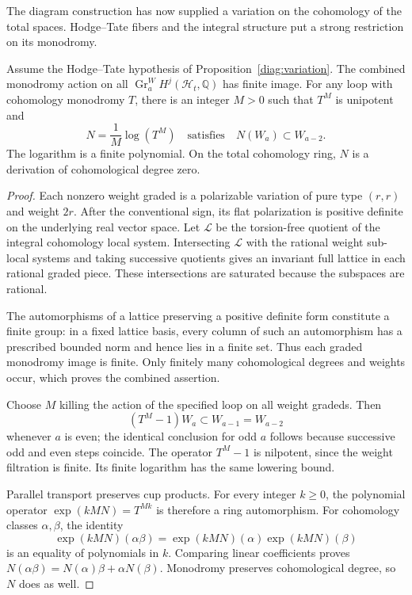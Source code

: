 The diagram construction has now supplied a variation on the
cohomology of the total spaces.  Hodge--Tate fibers and the integral
structure put a strong restriction on its monodromy.

\begin{lemma}
 \label{diag:finite}
 Assume the Hodge--Tate hypothesis of
 Proposition~\ref{diag:variation}.  The combined monodromy action
 on all $\operatorname{Gr}^W_aH^j(\mathscr H_t,\mathbb Q)$ has finite
 image.  For any loop with cohomology monodromy $T$, there is an integer
 $M>0$ such that $T^M$ is unipotent and
 \begin{equation}
  \label{diag:log}
  N=\frac{1}{M}\log(T^M)
  \quad\text{satisfies}\quad N(W_a)\subset W_{a-2}.
 \end{equation}
 The logarithm is a finite polynomial.  On the total cohomology ring,
 $N$ is a derivation of cohomological degree zero.
\end{lemma}

\begin{proof}
 Each nonzero weight graded is a polarizable variation of pure type
 $(r,r)$ and weight $2r$.  After the conventional sign, its flat
 polarization is positive definite on the underlying real vector
 space.  Let $\mathcal L$ be the torsion-free quotient of the integral
 cohomology local system.  Intersecting $\mathcal L$ with the rational
 weight sub-local systems and taking successive quotients gives an
 invariant full lattice in each rational graded piece.  These
 intersections are saturated because the subspaces are rational.

 The automorphisms of a lattice preserving a positive definite form
 constitute a finite group: in a fixed lattice basis, every column of
 such an automorphism has a prescribed bounded norm and hence lies
 in a finite set.  Thus each graded monodromy image is finite.  Only
 finitely many cohomological degrees and weights occur, which proves
 the combined assertion.

 Choose $M$ killing the action of the specified loop on all weight
 gradeds.  Then
 \[
 (T^M-1)W_a\subset W_{a-1}=W_{a-2}
 \]
 whenever $a$ is even; the identical conclusion for odd $a$ follows
 because successive odd and even steps coincide.  The operator
 $T^M-1$ is nilpotent, since the weight filtration is finite.
 Its finite logarithm has the same lowering bound.

 Parallel transport preserves cup products.  For every integer
 $k\geq0$, the polynomial operator $\exp(kMN)=T^{Mk}$ is therefore
 a ring automorphism.  For cohomology classes $\alpha,\beta$, the
 identity
 \[
 \exp(kMN)(\alpha\beta)
   =\exp(kMN)(\alpha)\exp(kMN)(\beta)
 \]
 is an equality of polynomials in $k$.  Comparing linear coefficients
 proves $N(\alpha\beta)=N(\alpha)\beta+\alpha N(\beta)$.
 Monodromy preserves cohomological degree, so $N$ does as well.
\end{proof}

